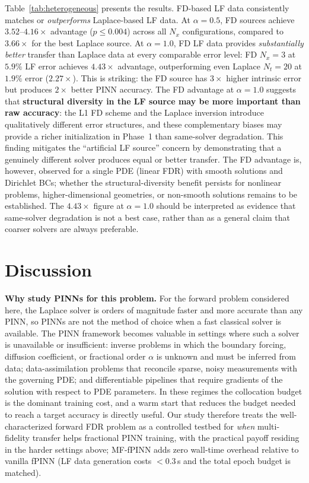 \documentclass[11pt]{article}
\begin{document}
Table~\ref{tab:heterogeneous} presents the results. FD-based LF data consistently matches or \emph{outperforms} Laplace-based LF data. At $\alpha = 0.5$, FD sources achieve $3.52$--$4.16\times$ advantage ($p \leq 0.004$) across all $N_x$ configurations, compared to $3.66\times$ for the best Laplace source. At $\alpha = 1.0$, FD LF data provides \emph{substantially better} transfer than Laplace data at every comparable error level: FD $N_x{=}3$ at $5.9\%$ LF error achieves $4.43\times$ advantage, outperforming even Laplace $N_t{=}20$ at $1.9\%$ error ($2.27\times$). This is striking: the FD source has $3\times$ higher intrinsic error but produces $2\times$ better PINN accuracy. The FD advantage at $\alpha = 1.0$ suggests that \textbf{structural diversity in the LF source may be more important than raw accuracy}: the L1 FD scheme and the Laplace inversion introduce qualitatively different error structures, and these complementary biases may provide a richer initialization in Phase~1 than same-solver degradation. This finding mitigates the ``artificial LF source'' concern by demonstrating that a genuinely different solver produces equal or better transfer. The FD advantage is, however, observed for a single PDE (linear FDR) with smooth solutions and Dirichlet BCs; whether the structural-diversity benefit persists for nonlinear problems, higher-dimensional geometries, or non-smooth solutions remains to be established. The $4.43\times$ figure at $\alpha = 1.0$ should be interpreted as evidence that same-solver degradation is not a best case, rather than as a general claim that coarser solvers are always preferable.

\section{Discussion}
\label{sec:discussion}

\textbf{Why study PINNs for this problem.} For the forward problem considered here, the Laplace solver is orders of magnitude faster and more accurate than any PINN, so PINNs are not the method of choice when a fast classical solver is available. The PINN framework becomes valuable in settings where such a solver is unavailable or insufficient: inverse problems in which the boundary forcing, diffusion coefficient, or fractional order $\alpha$ is unknown and must be inferred from data; data-assimilation problems that reconcile sparse, noisy measurements with the governing PDE; and differentiable pipelines that require gradients of the solution with respect to PDE parameters. In these regimes the collocation budget is the dominant training cost, and a warm start that reduces the budget needed to reach a target accuracy is directly useful. Our study therefore treats the well-characterized forward FDR problem as a controlled testbed for \emph{when} multi-fidelity transfer helps fractional PINN training, with the practical payoff residing in the harder settings above; MF-fPINN adds zero wall-time overhead relative to vanilla fPINN (LF data generation costs $<$0.3\,s and the total epoch budget is matched).
\end{document}

